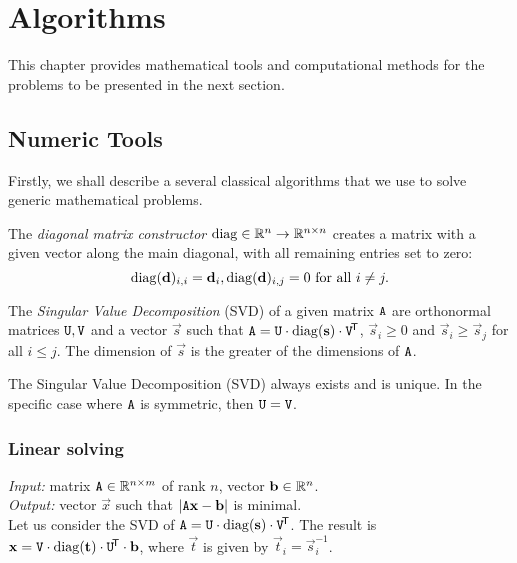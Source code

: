\chapter{Algorithms}

This chapter provides mathematical tools and computational methods for the problems to be presented in the next section.

\section{Numeric Tools}

Firstly, we shall describe a several classical algorithms that we use to solve generic mathematical problems.

\begin{definition}
The \textit{diagonal matrix constructor} $\mathrm{diag} \in \mathbb{R}^n \to \mathbb{R}^{n\times n}$ creates a matrix with a given vector along the main diagonal, with all remaining entries set to zero:
$$\mathrm{diag}(\mathbf{d})_{i, i} = \mathbf{d}_i, \mathrm{diag}(\mathbf{d})_{i,j} = 0 \textrm{ for all } i \neq j.$$
\end{definition}

\begin{definition}
The \textit{Singular Value Decomposition} (SVD) of a given matrix $\mathtt{A}$ are orthonormal matrices $\mathtt{U}, \mathtt{V}$ and a vector $\vec s$ such that $\mathtt{A} = \mathtt{U} \cdot \mathrm{diag}(\mathbf{s}) \cdot \mathtt{V}^{\!\mathsf{T}}$, $\vec s_i \geq 0$ and $\vec s_i \geq \vec s_j$ for all $i \leq j$.
The dimension of $\vec s$ is the greater of the dimensions of $\mathtt{A}$.
\end{definition}

\begin{claim}
The Singular Value Decomposition (SVD) always exists and is unique.
In the specific case where $\mathtt{A}$ is symmetric, then $\mathtt{U} = \mathtt{V}$.
\end{claim}

\subsection{Linear solving}
\textit{Input:} matrix $\mathtt{A} \in \mathbb{R}^{n \times m}$ of rank $n$, vector $\mathbf{b} \in \mathbb{R}^n$.\\
\textit{Output:} vector $\vec x$ such that $|\mathtt{A} \mathbf{x} - \mathbf{b}|$ is minimal.\\

Let us consider the SVD of $\mathtt{A} = \mathtt{U} \cdot \mathrm{diag}(\mathbf{s}) \cdot \mathtt{V}^{\!\mathsf{T}}$.
The result is $\mathbf{x} = \mathtt{V} \cdot \mathrm{diag}(\mathbf{t}) \cdot \mathtt{U}^{\!\mathsf{T}} \cdot \mathbf{b}$, where $\vec t$ is given by $\vec t_i = \vec s_i ^{-1}$.

